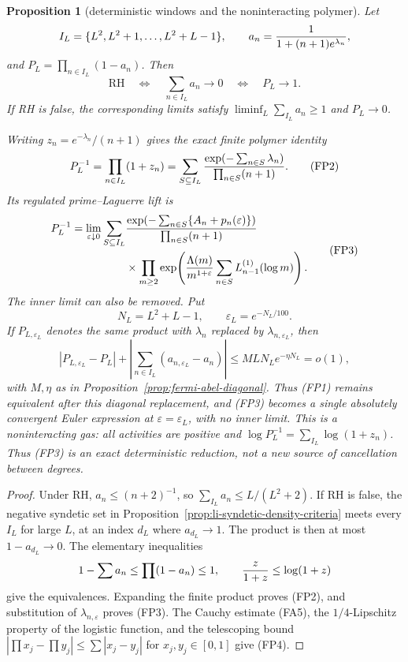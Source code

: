 \documentclass[11pt]{amsart}
\newtheorem{proposition}[theorem]{Proposition}
\theoremstyle{definition}
\theoremstyle{remark}
\theoremstyle{definition}
\newcommand{\RH}{\mathrm{RH}}
\begin{document}
\begin{proposition}[deterministic windows and the noninteracting polymer]
\label{prop:li-deterministic-polymer}
Let
\[
 I_L=\{L^2,L^2+1,\ldots,L^2+L-1\},\qquad
 a_n={1\over1+(n+1)e^{\lambda_n}},
\]
and $P_L=\prod_{n\in I_L}(1-a_n)$.  Then
\[
 \boxed{\quad\RH\quad\Longleftrightarrow\quad
 \sum_{n\in I_L}a_n\longrightarrow0
 \quad\Longleftrightarrow\quad P_L\longrightarrow1.\quad} \tag{FP1}
\]
If RH is false, the corresponding limits satisfy
$\liminf_L\sum_{I_L}a_n\ge1$ and $P_L\to0$.

Writing $z_n=e^{-\lambda_n}/(n+1)$ gives the exact finite polymer identity
\[
 P_L^{-1}=\prod_{n\in I_L}(1+z_n)
 =\sum_{S\subseteq I_L}
 {\exp(-\sum_{n\in S}\lambda_n)\over\prod_{n\in S}(n+1)}. \tag{FP2}
\]
Its regulated prime--Laguerre lift is
\[
\begin{aligned}
 P_L^{-1}=\lim_{\varepsilon\downarrow0}
 \sum_{S\subseteq I_L}
 &{\exp(-\sum_{n\in S}\{A_n+p_n(\varepsilon)\})
   \over\prod_{n\in S}(n+1)}\\
 &\times\prod_{m\ge2}\exp\!\left(
 {\Lambda(m)\over m^{1+\varepsilon}}
 \sum_{n\in S}L_{n-1}^{(1)}(\log m)\right).
\end{aligned}                                               \tag{FP3}
\]
The inner limit can also be removed.  Put
\[
 N_L=L^2+L-1,\qquad \varepsilon_L=e^{-N_L/100}.
\]
If $P_{L,\varepsilon_L}$ denotes the same product with
$\lambda_n$ replaced by $\lambda_{n,\varepsilon_L}$, then
\[
 |P_{L,\varepsilon_L}-P_L|
 +\left|\sum_{n\in I_L}(a_{n,\varepsilon_L}-a_n)\right|
 \le MLN_Le^{-\eta N_L}=o(1),                             \tag{FP4}
\]
with $M,\eta$ as in Proposition~\ref{prop:fermi-abel-diagonal}.
Thus (FP1) remains equivalent after this diagonal replacement, and (FP3)
becomes a single absolutely convergent Euler expression at
$\varepsilon=\varepsilon_L$, with no inner limit.
This is a noninteracting gas: all activities are positive and
$\log P_L^{-1}=\sum_{I_L}\log(1+z_n)$.  Thus (FP3) is an exact deterministic
reduction, not a new source of cancellation between degrees.
\end{proposition}

\begin{proof}
Under RH, $a_n\le(n+2)^{-1}$, so
$\sum_{I_L}a_n\le L/(L^2+2)$.  If RH is false, the negative syndetic set
in Proposition~\ref{prop:li-syndetic-density-criteria} meets every $I_L$
for large $L$, at an index $d_L$ where $a_{d_L}\to1$.  The product is then
at most $1-a_{d_L}\to0$.  The elementary inequalities
\[
 1-\sum a_n\le\prod(1-a_n)\le1,
 \qquad {z\over1+z}\le\log(1+z)
\]
give the equivalences.  Expanding the finite product proves (FP2), and
substitution of $\lambda_{n,\varepsilon}$ proves (FP3).  The Cauchy estimate
(FA5), the $1/4$-Lipschitz property of the logistic function, and the
telescoping bound
$|\prod x_j-\prod y_j|\le\sum|x_j-y_j|$ for $x_j,y_j\in[0,1]$
give (FP4).
\end{proof}
\end{document}
